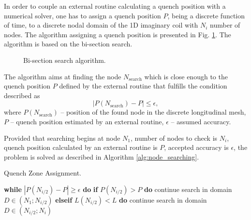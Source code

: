 
In order to couple an external routine calculating a quench position with a numerical solver, one has to assign a quench position $P$, being a discrete function of time, to a discrete nodal domain of the 1D imaginary coil with $N_i$ number of nodes. The algorithm assigning a quench position is presented in Fig. \ref{fig:node_search_algo}. The algorithm is based on the bi-section search. 

\begin{figure}[H]
    \centering
    \caption{Bi-section search algorithm.}
    \label{fig:node_search_algo}
\end{figure}

The algorithm aims at finding the node $N_\text{search}$ which is close enough to the quench position $P$ defined by the external routine that fulfills the condition described as
\begin{equation}
    |P(N_\text{search}) - P| \leq \epsilon,
    \label{eqn:bi-section_search}
\end{equation}
where $P(N_\text{search})$ -- position of the found node in the discrete longitudinal mesh, $P$ -- quench position estimated by an external routine, $\epsilon$ -- assumed accuracy. 

Provided that searching begins at node $N_1$, number of nodes to check is $N_i$, quench position calculated by an external routine is $P$, accepted accuracy is $\epsilon$, the problem is solved as described in Algorithm \ref{alg:node_searching}.

\begin{algorithm}[H]
    \caption{Quench Zone Assignment.}
    \label{alg:node_searching}
    \begin{algorithmic}[1]

    \STATE \textbf{while} $|P(N_{i/2}) - P| \geq \epsilon$ \textbf{do}
    \STATE \hspace{0.5cm} \textbf{if} $P(N_{i/2}) > P$ \textbf{do}
    \STATE \hspace{1.0cm} continue search in domain $D \in (N_1;N_{i/2})$
    \STATE \hspace{0.5cm} \textbf{elseif} $L(N_{i/2}) < L$ \textbf{do}
    \STATE \hspace{1.0cm} continue search in domain $D \in (N_{i/2}; N_i)$
    \end{algorithmic}
\end{algorithm}

